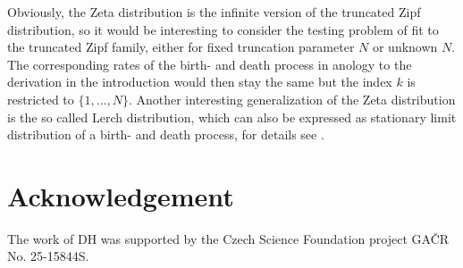 \documentclass{article}
\theoremstyle{thm}
\theoremstyle{def}
\begin{document}
Obviously, the Zeta distribution is the infinite version of the truncated Zipf distribution, so it would be interesting to consider the testing problem of fit to the truncated Zipf family, either for fixed truncation parameter $N$ or unknown $N$. The corresponding rates of the birth- and death process in anology to the derivation in the introduction would then stay the same but the index $k$ is restricted to $\{1,\ldots,N\}$. Another interesting generalization of the Zeta distribution is the so called Lerch distribution, which can also be expressed as stationary limit distribution of a birth- and death process, for details see \cite{KPH:2010}.

\section*{Acknowledgement}
The work of DH was supported by the Czech Science Foundation project GAČR No. 25-15844S.




\end{document}
